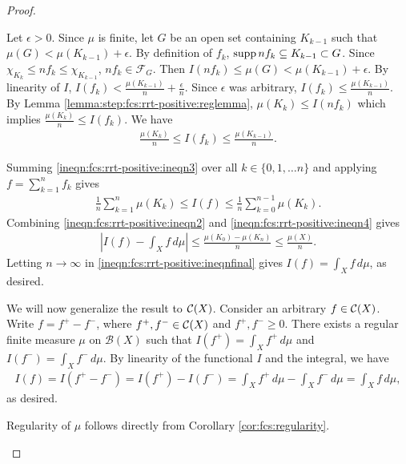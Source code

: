 \begin{proof}
\begin{step}
Let $\epsilon >0$. Since $\mu$ is finite, let $G$ be an open set containing $K_{k-1}$ such that $\mu(G) < \mu(K_{k-1}) + \epsilon$. By definition of $f_k$, $\operatorname{supp} n f_k \subseteq K_{k-1} \subset G$. Since $\chi_{K_k} \leq n f_k \leq \chi_{K_{k-1}}$, $n f_k \in \mathcal{F}_G$. Then $I(n f_k) \leq \mu(G) <  \mu(K_{k-1}) + \epsilon$. \newpage
By linearity of $I$, $I(f_k) < \frac{\mu(K_{k-1})}{n} + \frac{\epsilon}{n}$. Since $\epsilon$ was arbitrary, $I(f_k) \leq \frac{\mu(K_{k-1})}{n}$. By Lemma \ref{lemma:step:fcs:rrt-positive:reglemma}, $\mu(K_k) \leq I (n f_k)$ which implies $\frac{\mu(K_k)}{n} \leq I (f_k)$. We have \begin{align}
\label{ineqn:fcs:rrt-positive:ineqn3}
    \frac{\mu(K_k)}{n} \leq I (f_k) \leq  \frac{\mu(K_{k-1})}{n}.
\end{align} 

Summing \ref{ineqn:fcs:rrt-positive:ineqn3} over all $k \in \{ 0, 1, \ldots n \}$ and applying $f = \sum_{k = 1}^n f_k$ gives
\begin{align}
     \label{ineqn:fcs:rrt-positive:ineqn4}
     \frac{1}{n} \sum_{k=1}^n \mu(K_k) \leq I(f) \leq \frac{1}{n} \sum_{k=0}^{n-1} \mu(K_k).
\end{align}
Combining \ref{ineqn:fcs:rrt-positive:ineqn2} and \ref{ineqn:fcs:rrt-positive:ineqn4} gives \begin{align}
    \label{ineqn:fcs:rrt-positive:ineqnfinal}    
    \left | I(f) - \int_{X} f \,d\mu \right | \leq \frac{\mu(K_0) - \mu(K_n)}{n} \leq \frac{\mu(X)}{n}.
\end{align}
Letting $n \to \infty$  in \ref{ineqn:fcs:rrt-positive:ineqnfinal} gives $I(f) = \int_{X} f \, d\mu$, as desired.

We will now generalize the result to ${\mathcal C}(X)$. Consider an arbitrary $f \in {\mathcal C}(X)$. Write $f = f^+ - f^-$, where $f^+, f^- \in {\mathcal C}(X)$ and $f^+, f^- \geq 0$. There exists a regular finite measure $\mu$ on $\mathcal{B}(X)$ such that
$ I(f^+) = \int_{X} f^+ \,d\mu$ and $I(f^-) = \int_{X} f^- \,d\mu$. By linearity of the functional $I$ and the integral, we have \begin{align*}
    I (f) = I(f^+ - f^-) = I(f^+) - I(f^-) =   \int_{X} f^+ \,d\mu -  \int_{X} f^- \,d\mu =  \int_{X} f \,d\mu,
\end{align*}
as desired.
\end{step}

\begin{step}[Regularity]
Regularity of $\mu$ follows directly from Corollary \ref{cor:fcs:regularity}.
\end{step}


\end{proof}
